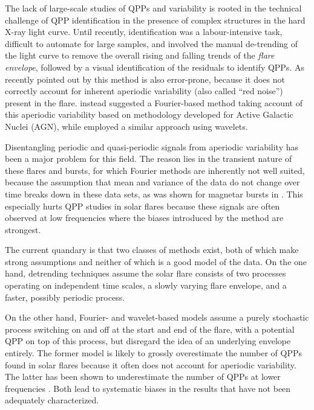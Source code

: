 \documentclass{aastex61}
\begin{document}
The lack of large-scale studies of QPPs and variability is rooted in the technical challenge of QPP identification in the presence of complex structures in the hard X-ray light curve. 
Until recently, identification was a labour-intensive task, difficult to automate for large samples, and involved the manual de-trending of the light curve to remove the overall rising and falling trends of the \textit{flare envelope}, followed by a visual identification of the residuals to identify QPPs. 
As recently pointed out by \citep{inglis2015} this method is also error-prone, because it does not correctly account for inherent aperiodic variability (also called ``red noise'') present in the flare.
\citep{inglis2015} instead suggested a Fourier-based method taking account of this aperiodic variability based on methodology developed for Active Galactic Nuclei (AGN), while \citep{simoes2015} employed a similar approach using wavelets. 

Disentangling periodic and quasi-periodic signals from aperiodic variability has been a major problem for this field. 
The reason lies in the transient nature of these flares and bursts, for which Fourier methods are inherently not well suited, because the assumption that mean and variance of the data do not change over time breaks down in these data sets, as was shown for magnetar bursts in . 
This especially hurts QPP studies in solar flares because these signals are often observed at low frequencies where the biases introduced by the method are strongest. 

The current quandary is that two classes of methods exist, both of which make strong assumptions and neither of which is a good model of the data. On the one hand, detrending techniques assume the solar flare consists of two processes operating on independent time scales, a slowly varying flare envelope, and a faster, possibly periodic process. 

On the other hand, Fourier- and wavelet-based models assume a purely stochastic process switching on and off at the start and end of the flare, with a potential QPP on top of this process, but disregard the idea of an underlying envelope entirely. 
The former model is likely to grossly overestimate the number of QPPs found in solar flares because it often does not account for aperiodic variability. The latter has been shown to underestimate the number of QPPs at lower frequencies \citep{huppenkothen2013}. 
Both lead to systematic biases in the results that have not been adequately characterized.
\end{document}
